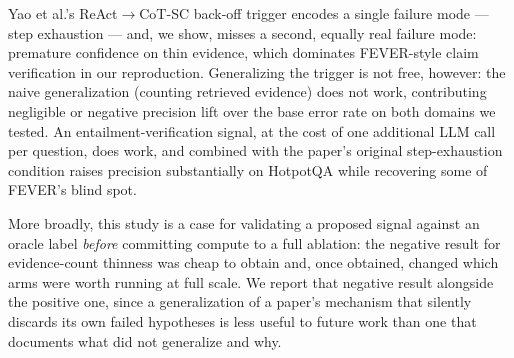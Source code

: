 Yao et al.'s ReAct$\to$CoT-SC back-off trigger encodes a single failure
mode --- step exhaustion --- and, we show, misses a second, equally real
failure mode: premature confidence on thin evidence, which dominates
FEVER-style claim verification in our reproduction. Generalizing the
trigger is not free, however: the naive generalization (counting
retrieved evidence) does not work, contributing negligible or negative
precision lift over the base error rate on both domains we tested. An
entailment-verification signal, at the cost of one additional LLM call
per question, does work, and combined with the paper's original
step-exhaustion condition raises precision substantially on HotpotQA while
recovering some of FEVER's blind spot.

More broadly, this study is a case for validating a proposed signal
against an oracle label \emph{before} committing compute to a full
ablation: the negative result for evidence-count thinness was cheap to
obtain and, once obtained, changed which arms were worth running at full
scale. We report that negative result alongside the positive one, since a
generalization of a paper's mechanism that silently discards its own
failed hypotheses is less useful to future work than one that documents
what did not generalize and why.
